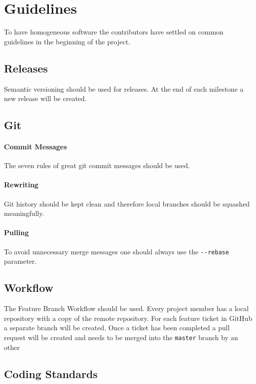 \section{Guidelines}\label{guidelines}
To have homogeneous software the contributors have settled on common guidelines in the beginning of the project.

\subsection{Releases}
Semantic versioning \cite{pm_7_preston-werner_2015} should be used for releases.
At the end of each milestone a new release will be created.
\newpage

\subsection{Git}\label{git}
\paragraph{Commit Messages}
The seven rules of great git commit
messages\cite{pm_8_chris.beams.io_2015} should be used.

\paragraph{Rewriting}
Git history should be kept clean and therefore local branches should be
squashed meaningfully.

\paragraph{Pulling}
To avoid unnecessary merge messages one should always use the
\texttt{-\/-rebase} parameter.

\subsection{Workflow}\label{git-workflow}
The Feature Branch Workflow\cite{pm_9_atlassian_git_tutorial_2015} should be used. Every project member has a local repository with a copy of the remote
repository. For each feature ticket in GitHub a separate branch
will be created. Once a ticket has been completed a pull request will be
created and needs to be merged into the \texttt{master} branch by an other 

\subsection{Coding Standards}

